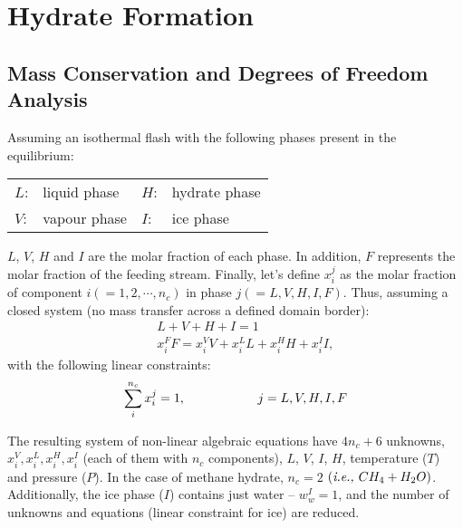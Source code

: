
\chapter{Hydrate Formation}\label{Chapter:Hydrate}


\section{Mass Conservation and Degrees of Freedom Analysis}

Assuming an isothermal flash with the following phases present in the equilibrium:
  \begin{center}
    \begin{tabular}{l l l l}
      $L$: & liquid phase & $H$: & hydrate phase \\
      $V$: & vapour phase & $I$: & ice phase \\ 
    \end{tabular}
  \end{center}
$L$, $V$, $H$ and $I$ are the molar fraction of each phase. In addition, $F$ represents the molar fraction of the feeding stream. Finally, let's define $x_{i}^{j}$ as the molar fraction of component $i \left(=1,2,\cdots,n_{c}\right)$ in phase $j \left(=L,V,H,I,F\right)$. Thus, assuming a closed system (\ie no mass transfer across a defined domain border):
  \begin{eqnarray}
     && L + V + H + I = 1 \\\label{Chapter:Hydrate:Eqn:Balance:MassFractionPhase}
     && x_{i}^{F}F = x_{i}^{V}V + x_{i}^{L}L + x_{i}^{H}H + x_{i}^{I}I, \label{Chapter:Hydrate:Eqn:Balance:MassFractionComponent}
  \end{eqnarray}
with the following linear constraints:
  \begin{equation}
    \sum\limits_{i}^{n_{c}} x_{i}^{j} = 1, \hspace{2cm} j=L,V,H,I,F\label{Chapter:Hydrate:Eqn:Balance:MassFractionConstraint}
  \end{equation}
 
The resulting system of non-linear algebraic equations have $4n_{c}+6$ unknowns, \ie $x_{i}^{V}, x_{i}^{L}, x_{i}^{H}, x_{i}^{I}$ (each of them with $n_{c}$ components), $L$, $V$, $I$, $H$, temperature ($T$) and pressure ($P$).  In the case of methane hydrate, $n_{c}=2$ $\left(\text{{\em{i.e., }}} CH_{4}+H_{2}O\right)$. Additionally, the ice phase ($I$) contains just water -- $w_{w}^{I}=1$, and the number of unknowns and equations (linear constraint for ice) are reduced.

